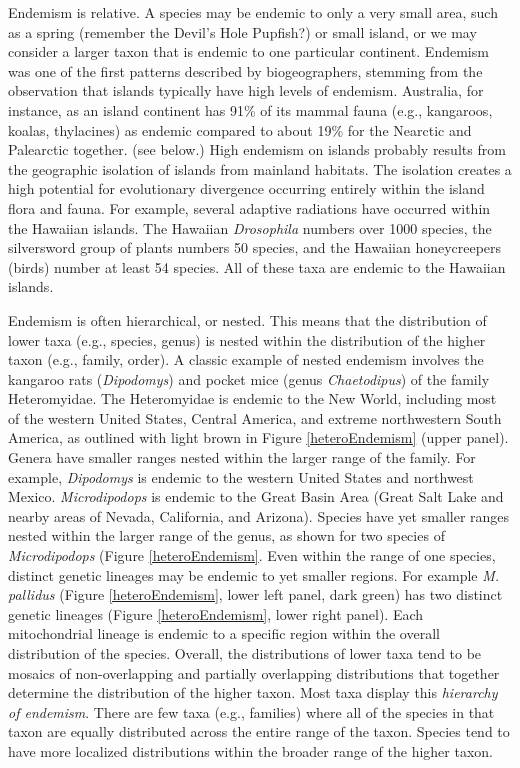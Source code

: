 \documentclass[11pt, oneside]{article}   	%
\begin{document}
Endemism is relative. A  species may be endemic to only a very small area, such as a spring (remember the Devil's Hole Pupfish?) or small island, or we may consider a larger taxon that is endemic to one particular continent. Endemism was one of the first patterns described by biogeographers, stemming from the observation that islands typically have high levels of endemism.  Australia, for instance, as an island continent has 91\% of its mammal fauna (e.g., kangaroos, koalas, thylacines) as endemic compared to about 19\% for the Nearctic and Palearctic together.  (see below.)  High endemism on islands probably results from the geographic isolation of islands from mainland habitats. The isolation creates a high potential for evolutionary divergence occurring entirely within the island flora and fauna.  For example, several adaptive radiations have occurred within the Hawaiian islands.  The Hawaiian \emph{Drosophila} numbers over 1000 species, the silversword group of plants numbers 50 species, and the Hawaiian honeycreepers (birds) number at least 54 species.  All of these taxa are endemic to the Hawaiian islands. 

Endemism is often hierarchical, or nested.  This means that the distribution of lower taxa (e.g., species, genus) is nested within the distribution of the higher taxon (e.g., family, order).  A classic example of nested endemism involves the kangaroo rats (\emph{Dipodomys}) and pocket mice (genus \emph{Chaetodipus}) of the family Heteromyidae.  The Heteromyidae is endemic to the New World, including most of the western United States, Central America, and extreme northwestern South America, as outlined with light brown in Figure \ref{heteroEndemism} (upper panel).  Genera have smaller ranges nested within the larger range of the family. For example, \emph{Dipodomys} is endemic to the western United States and northwest Mexico. \emph{Microdipodops} is endemic to the Great Basin Area (Great Salt Lake and nearby areas of Nevada, California,  and Arizona). Species have yet smaller ranges nested within the larger range of the genus, as shown for two species of \emph{Microdipodops} (Figure \ref{heteroEndemism}.  Even within the range of one species, distinct genetic lineages may be endemic to yet smaller regions. For example \emph{M. pallidus} (Figure \ref{heteroEndemism}, lower left panel, dark green) has two distinct genetic lineages (Figure \ref{heteroEndemism}, lower right panel).  Each mitochondrial lineage is endemic to a specific region within the overall distribution of the species. Overall, the distributions of lower taxa tend to be mosaics of non-overlapping and partially overlapping distributions that together determine the distribution of the higher taxon. Most taxa display this \emph{hierarchy of endemism}.  There are few taxa (e.g., families) where all of the species in that taxon are equally distributed across the entire range of the taxon.  Species tend to have more localized distributions within the broader range of the higher taxon.
\end{document}
